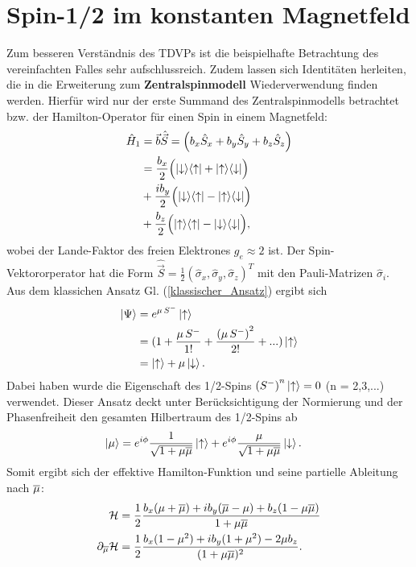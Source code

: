 \section{Spin-1/2 im konstanten Magnetfeld}
Zum besseren Verständnis des TDVPs ist die beispielhafte Betrachtung des vereinfachten Falles sehr aufschlussreich. 
Zudem lassen sich Identitäten herleiten, die in die Erweiterung zum \textbf{Zentralspinmodell} Wiederverwendung finden werden. Hierfür wird nur der erste 
Summand des Zentralspinmodells betrachtet bzw. der Hamilton-Operator für einen Spin in einem Magnetfeld:
\begin{align}
    \hat{H}_1 &= \vec{b}\hat{\vec{S}} = \left(b_x\hat{S}_x+b_y\hat{S}_y+b_z\hat{S}_z \right) \\
    &= \frac{b_x}{2}\Bigl(\ket{\downarrow}\!\bra{\uparrow}+\ket{\uparrow}\!\bra{\downarrow}\Bigr) \\
    & + \frac{ib_y}{2}\Bigl(\ket{\downarrow}\!\bra{\uparrow}-\ket{\uparrow}\!\bra{\downarrow}\Bigr) \\
    & + \frac{b_z}{2}\Bigl(\ket{\uparrow}\!\bra{\uparrow}-\ket{\downarrow}\!\bra{\downarrow}\Bigr), 
\end{align}
\noindent wobei der Lande-Faktor des freien Elektrones $g_e\approx 2$ ist. 
Der Spin-Vektororperator hat die Form $\hat{\vec{S}}= \frac{1}{2}\left(\hat{\sigma}_x,\hat{\sigma}_y,\hat{\sigma}_z\right)^T$ mit den Pauli-Matrizen 
$\hat{\sigma}_i$. Aus dem klassichen Ansatz Gl. (\ref{klassischer_Ansatz}) ergibt sich
\begin{align*}
    \ket{\Psi} &= e^{\mu\thinspace S^-}\ket{\uparrow} \\
            &= (1 + \frac{\mu\thinspace S^{-}}{1!} + \frac{\left(\mu\thinspace S^{-}\right)^2}{2!} + ...)\ket{\uparrow}    \\
            &= \ket{\uparrow} + \mu\ket{\downarrow}.
\end{align*}
\noindent Dabei haben wurde die Eigenschaft des 1/2-Spins $\left(S^{-}\right)^{n}\ket{\uparrow}=0$  (n = 2,3,...) verwendet.
Dieser Ansatz deckt unter Berücksichtigung der Normierung und der Phasenfreiheit den gesamten Hilbertraum des 1/2-Spins ab
\begin{align}
    \ket{\mu} &= e^{i\phi}\frac{1}{\sqrt{1 + \mu\overline{\mu}}}\ket{\uparrow} + e^{i\phi}\frac{\mu}{\sqrt{1 + \mu\overline{\mu}}}\ket{\downarrow}.
\end{align} 
Somit ergibt sich der effektive Hamilton-Funktion und seine partielle Ableitung nach $\overline{\mu}$:
\begin{align}
    \mathcal{H} &= \frac{1}{2}\frac{b_x(\mu +\overline{\mu}) + ib_y(\overline{\mu} - \mu) + b_z(1-\mu\overline{\mu}) }{1+\mu\overline{\mu}}    \\
    \partial_{\overline{\mu}} \mathcal{H} &= \frac{1}{2} \frac{b_x(1-\mu^2) + ib_y(1+\mu^2) - 2\mu b_z}{(1+\mu\overline{\mu})^2} .
\end{align}
